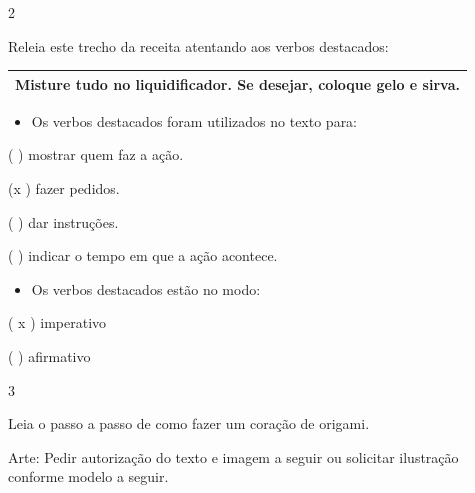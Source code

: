 \begin{itemize}
{{{\begin{itemize}
\num{2}

Releia este trecho da receita atentando aos verbos destacados:

\begin{longtable}[]{@{}l@{}}
\toprule
\textbf{Misture} tudo no liquidificador. Se desejar, \textbf{coloque}
gelo e sirva.\tabularnewline
\bottomrule
\end{longtable}

\begin{itemize}
\item
  Os verbos destacados foram utilizados no texto para:
\end{itemize}

( ) mostrar quem faz a ação.

(x ) fazer pedidos.

( ) dar instruções.

( ) indicar o tempo em que a ação acontece.

\begin{itemize}
\item
  Os verbos destacados estão no modo:
\end{itemize}

( x ) imperativo

( ) afirmativo

\num{3}

Leia o passo a passo de como fazer um coração de origami.

Arte: Pedir autorização do texto e imagem a seguir ou solicitar
ilustração conforme modelo a seguir.


\end{itemize}}}}
\end{itemize}
